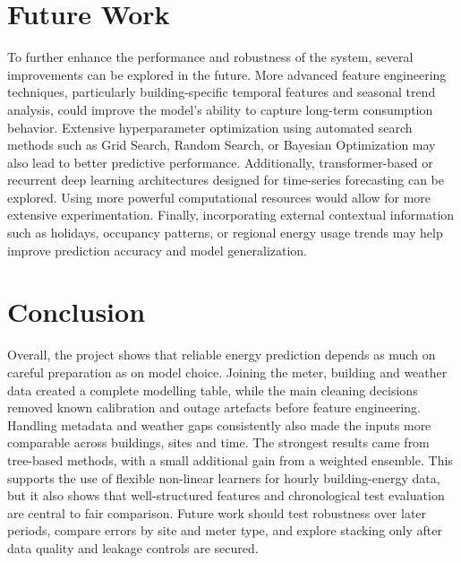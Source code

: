 \documentclass{article}
\begin{document}
\section{Future Work}
To further enhance the performance and robustness of the system, several improvements can be explored in the future. More advanced feature engineering techniques, particularly building-specific temporal features and seasonal trend analysis, could improve the model's ability to capture long-term consumption behavior. Extensive hyperparameter optimization using automated search methods such as Grid Search, Random Search, or Bayesian Optimization may also lead to better predictive performance. Additionally, transformer-based or recurrent deep learning architectures designed for time-series forecasting can be explored. Using more powerful computational resources would allow for more extensive experimentation. Finally, incorporating external contextual information such as holidays, occupancy patterns, or regional energy usage trends may help improve prediction accuracy and model generalization.

\section{Conclusion}
Overall, the project shows that reliable energy prediction depends as much on careful preparation as on model choice. Joining the meter, building and weather data created a complete modelling table, while the main cleaning decisions removed known calibration and outage artefacts before feature engineering. Handling metadata and weather gaps consistently also made the inputs more comparable across buildings, sites and time.
The strongest results came from tree-based methods, with a small additional gain from a weighted ensemble. This supports the use of flexible non-linear learners for hourly building-energy data, but it also shows that well-structured features and chronological test evaluation are central to fair comparison. Future work should test robustness over later periods, compare errors by site and meter type, and explore stacking only after data quality and leakage controls are secured.


 

\end{document}
